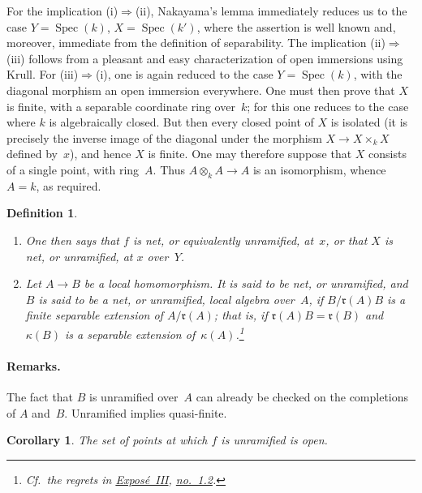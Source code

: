 \documentclass[11pt,oneside]{amsbook}
\newtheorem{corollary}[proposition]{Corollary}
\newtheorem{definition}[proposition]{Definition}
\theoremstyle{remark}
\theoremstyle{plain}
\numberwithin{equation}{section}
\begin{document}
For the implication \textup{(i)}\(\Rightarrow\)\textup{(ii)}, Nakayama's
lemma immediately reduces us to the case
\(Y=\operatorname{Spec}(k)\), \(X=\operatorname{Spec}(k')\), where the
assertion is well known and, moreover, immediate from the definition of
separability.  The implication \textup{(ii)}\(\Rightarrow\)\textup{(iii)}
follows from a pleasant and easy characterization of open immersions using
Krull.  For \textup{(iii)}\(\Rightarrow\)\textup{(i)}, one is
again reduced to the case \(Y=\operatorname{Spec}(k)\), with the diagonal
morphism an open immersion everywhere.  One must then prove that \(X\) is
finite, with a separable coordinate ring over~\(k\); for this one reduces to
the case where \(k\) is algebraically closed.  But then every closed point of
\(X\) is isolated (it is precisely the inverse image of the diagonal under
the morphism \(X\to X\times_k X\) defined by~\(x\)), and hence \(X\) is
finite.  One may therefore suppose that \(X\) consists of a single point,
with ring~\(A\).  Thus \(A\otimes_kA\to A\) is an isomorphism, whence
\(A=k\), as required.

\begin{definition}
\label{I.3.2}
\begin{enumerate}
\item[(a)] One then says that \(f\) is \emph{net}, or equivalently
  \emph{unramified}, at~\(x\), or that \(X\) is net, or unramified, at
  \(x\) over~\(Y\).
\item[(b)] Let \(A\to B\) be a local homomorphism.  It is said to be
  \emph{net}, or \emph{unramified}, and \(B\) is said to be a net, or
  unramified, local algebra over~\(A\), if
  \(B/\mathfrak r(A)B\) is a finite separable extension of
  \(A/\mathfrak r(A)\); that is, if
  \(\mathfrak r(A)B=\mathfrak r(B)\) and \(\kappa(B)\) is a separable
  extension of~\(\kappa(A)\).\footnote{Cf.\ the regrets in
  \hyperref[III]{Expos\'e~III}, \hyperref[III.1.2]{no.~1.2}.}
\end{enumerate}
\end{definition}

\paragraph{Remarks.}
The fact that
\(B\) is unramified over~\(A\) can already be checked on the completions of
\(A\) and~\(B\).  Unramified implies quasi-finite.

\begin{corollary}
\label{I.3.3}
The set of points at which \(f\) is unramified is open.
\end{corollary}
\end{document}
